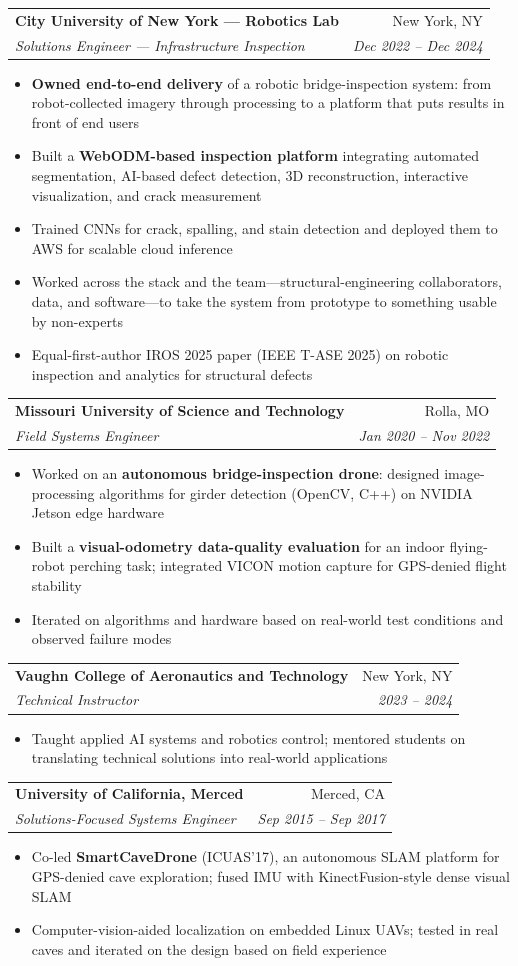 \documentclass[letterpaper,10pt]{article}
\makeatletter
\newcommand{\resumeBullet}[1]{
  \item\small{#1 \vspace{-2pt}}
}
\newcommand{\resumeSubheading}[4]{
  \vspace{-1pt}\item
    \begin{tabular*}{0.97\textwidth}{l@{\extracolsep{\fill}}r}
      \textbf{#1} & #2 \\
      \textit{\small#3} & \textit{\small #4} \\
    \end{tabular*}\vspace{-5pt}
}
\newcommand{\resumeItemListStart}{\begin{itemize}}
\newcommand{\resumeItemListEnd}{\end{itemize}\vspace{-5pt}}
\makeatother
\begin{document}
    \resumeSubheading
      {City University of New York --- Robotics Lab}{New York, NY}
      {Solutions Engineer --- Infrastructure Inspection}{Dec 2022 -- Dec 2024}
      \resumeItemListStart
        \resumeBullet{\textbf{Owned end-to-end delivery} of a robotic bridge-inspection system: from robot-collected imagery through processing to a platform that puts results in front of end users}
        \resumeBullet{Built a \textbf{WebODM-based inspection platform} integrating automated segmentation, AI-based defect detection, 3D reconstruction, interactive visualization, and crack measurement}
        \resumeBullet{Trained CNNs for crack, spalling, and stain detection and deployed them to AWS for scalable cloud inference}
        \resumeBullet{Worked across the stack and the team---structural-engineering collaborators, data, and software---to take the system from prototype to something usable by non-experts}
        \resumeBullet{Equal-first-author IROS 2025 paper (IEEE T-ASE 2025) on robotic inspection and analytics for structural defects}
      \resumeItemListEnd

    \resumeSubheading
      {Missouri University of Science and Technology}{Rolla, MO}
      {Field Systems Engineer}{Jan 2020 -- Nov 2022}
      \resumeItemListStart
        \resumeBullet{Worked on an \textbf{autonomous bridge-inspection drone}: designed image-processing algorithms for girder detection (OpenCV, C++) on NVIDIA Jetson edge hardware}
        \resumeBullet{Built a \textbf{visual-odometry data-quality evaluation} for an indoor flying-robot perching task; integrated VICON motion capture for GPS-denied flight stability}
        \resumeBullet{Iterated on algorithms and hardware based on real-world test conditions and observed failure modes}
      \resumeItemListEnd

    \resumeSubheading
      {Vaughn College of Aeronautics and Technology}{New York, NY}
      {Technical Instructor}{2023 -- 2024}
      \resumeItemListStart
        \resumeBullet{Taught applied AI systems and robotics control; mentored students on translating technical solutions into real-world applications}
      \resumeItemListEnd

    \resumeSubheading
      {University of California, Merced}{Merced, CA}
      {Solutions-Focused Systems Engineer}{Sep 2015 -- Sep 2017}
      \resumeItemListStart
        \resumeBullet{Co-led \textbf{SmartCaveDrone} (ICUAS'17), an autonomous SLAM platform for GPS-denied cave exploration; fused IMU with KinectFusion-style dense visual SLAM}
        \resumeBullet{Computer-vision-aided localization on embedded Linux UAVs; tested in real caves and iterated on the design based on field experience}
      \resumeItemListEnd
\end{document}
